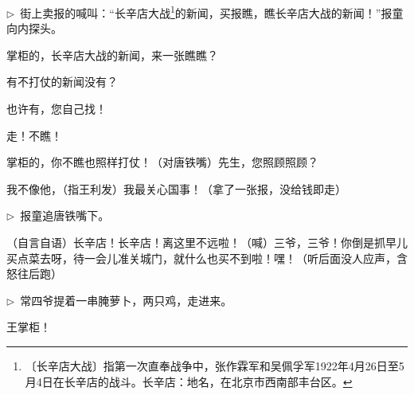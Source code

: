 \documentclass[12pt,UTF-8,openany]{ctexbook}
\begin{document}
\begin{large}
\begin{description}[itemsep=0.5ex,leftmargin=4.5em,labelwidth=4em]
    \end{description}
    
    \noindent $\triangleright$~街上卖报的喊叫：“长辛店大战\footnote{〔长辛店大战〕指第一次直奉战争中，张作霖军和吴佩孚军1922年4月26日至5月4日在长辛店的战斗。长辛店：地名，在北京市西南部丰台区。}的新闻，买报瞧，瞧长辛店大战的新闻！”报童向内探头。
    
    \begin{description}[itemsep=0.5ex,leftmargin=4.5em,labelwidth=4em]
    
    \item[{\color{script-4-7} 报童}]掌柜的，长辛店大战的新闻，来一张瞧瞧？
    
    \item[{\color{script-4-2} 王利发}]有不打仗的新闻没有？
    
    \item[{\color{script-4-7} 报童}]也许有，您自己找！
    
    \item[{\color{script-4-2} 王利发}]走！不瞧！
    
    \item[{\color{script-4-7} 报童}]掌柜的，你不瞧也照样打仗！（对唐铁嘴）先生，您照顾照顾？
    
    \item[{\color{script-4-6} 唐铁嘴}]我不像他，（指王利发）我最关心国事！（拿了一张报，没给钱即走）
    
    \end{description}
    
    \noindent $\triangleright$~报童追唐铁嘴下。
    
    \begin{description}[itemsep=0.5ex,leftmargin=4.5em,labelwidth=4em]
    
    \item[{\color{script-4-2} 王利发}]（自言自语）长辛店！长辛店！离这里不远啦！（喊）三爷，三爷！你倒是抓早儿买点菜去呀，待一会儿准关城门，就什么也买不到啦！嘿！（听后面没人应声，含怒往后跑）
    
    \end{description}
    
    \noindent $\triangleright$~常四爷提着一串腌萝卜，两只鸡，走进来。
    
    \begin{description}[itemsep=0.5ex,leftmargin=4.5em,labelwidth=4em]
    
    \item[{\color{script-4-8} 常四爷}]王掌柜！
    

\end{description}
\end{large}
\end{document}
